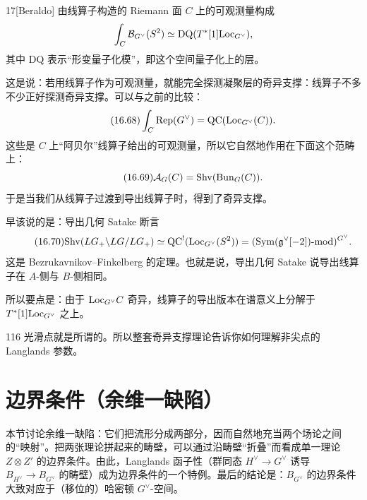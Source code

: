 \begin{srcthm}{17}[Beraldo]
由线算子构造的 Riemann 面 $C$ 上的可观测量构成
\[
\int_C\mathcal{B}_{G^\vee}(S^2)\simeq\mathrm{DQ}(T^*[1]\mathrm{Loc}_{G^\vee}),
\]
其中 $\mathrm{DQ}$ 表示“形变量子化模”，即这个空间量子化上的层。
\end{srcthm}

这是说：若用线算子作为可观测量，就能完全探测凝聚层的奇异支撑：线算子不多不少正好探测奇异支撑。可以与之前的比较：
\begin{equation}\tag{16.68}
\int_C\mathrm{Rep}(G^\vee)=\mathrm{QC}(\mathrm{Loc}_{G^\vee}(C)).
\end{equation}
这些是 $C$ 上“阿贝尔”线算子给出的可观测量，所以它自然地作用在下面这个范畴上：
\begin{equation}\tag{16.69}
\mathcal{A}_G(C)=\mathrm{Shv}(\mathrm{Bun}_G(C)).
\end{equation}
于是当我们从线算子过渡到导出线算子时，得到了奇异支撑。

早该说的是：导出几何 Satake 断言
\begin{equation}\tag{16.70}
\mathrm{Shv}(LG_+\backslash LG/LG_+)\simeq\mathrm{QC}^!(\mathrm{Loc}_{G^\vee}(S^2))=(\mathrm{Sym}(\mathfrak{g}^\vee[-2])\text{-}\mathrm{mod})^{G^\vee}.
\end{equation}
这是 Bezrukavnikov--Finkelberg 的定理。也就是说，导出几何 Satake 说导出线算子在 $A$-侧与 $B$-侧相同。%

所以要点是：由于 $\mathrm{Loc}_{G^\vee}C$ 奇异，线算子的导出版本在谱意义上分解于 $T^*[1]\mathrm{Loc}_{G^\vee}$ 之上。

\begin{srcrem}{116}
光滑点就是所谓的。所以整套奇异支撑理论告诉你如何理解非尖点的 Langlands 参数。
\end{srcrem}

\section{边界条件（余维一缺陷）}
\begin{sectionkey}
本节讨论余维一缺陷：它们把流形分成两部分，因而自然地充当两个场论之间的“映射”。把两张理论拼起来的畴壁，可以通过沿畴壁“折叠”而看成单一理论 $Z\otimes Z'$ 的边界条件。由此，Langlands 函子性（群同态 $H^\vee\to G^\vee$ 诱导 $B_{H^\vee}\to B_{G^\vee}$ 的畴壁）成为边界条件的一个特例。最后的结论是：$B_{G^\vee}$ 的边界条件大致对应于（移位的）哈密顿 $G^\vee$-空间。
\end{sectionkey}


